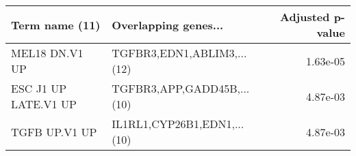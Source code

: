 \begin{tabular}{llr}
\toprule
      Term name (11) &        Overlapping genes... &  Adjusted p-value \\
\midrule
      MEL18 DN.V1 UP &  TGFBR3,EDN1,ABLIM3,...(12) &          1.63e-05 \\
ESC J1 UP LATE.V1 UP &  TGFBR3,APP,GADD45B,...(10) &          4.87e-03 \\
       TGFB UP.V1 UP & IL1RL1,CYP26B1,EDN1,...(10) &          4.87e-03 \\
\bottomrule
\end{tabular}
